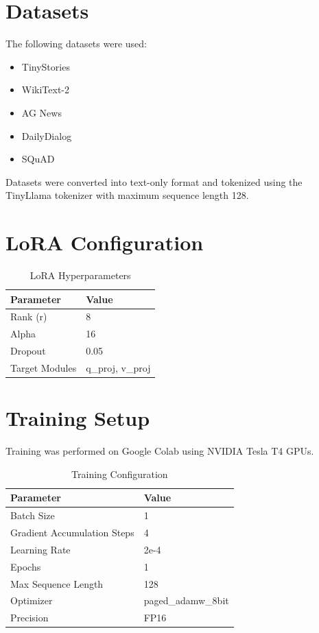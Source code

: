 \documentclass[12pt]{article}
\begin{document}

\section{Datasets}

The following datasets were used:

\begin{itemize}
    \item TinyStories
    \item WikiText-2
    \item AG News
    \item DailyDialog
    \item SQuAD
\end{itemize}

Datasets were converted into text-only format and tokenized using the TinyLlama tokenizer with maximum sequence length 128.


\section{LoRA Configuration}

\begin{table}[H]
\centering
\begin{tabular}{ll}
\toprule
Parameter & Value \\
\midrule
Rank (r) & 8 \\
Alpha & 16 \\
Dropout & 0.05 \\
Target Modules & q\_proj, v\_proj \\
\bottomrule
\end{tabular}
\caption{LoRA Hyperparameters}
\end{table}


\section{Training Setup}

Training was performed on Google Colab using NVIDIA Tesla T4 GPUs.

\begin{table}[H]
\centering
\begin{tabular}{ll}
\toprule
Parameter & Value \\
\midrule
Batch Size & 1 \\
Gradient Accumulation Steps & 4 \\
Learning Rate & 2e-4 \\
Epochs & 1 \\
Max Sequence Length & 128 \\
Optimizer & paged\_adamw\_8bit \\
Precision & FP16 \\
\bottomrule
\end{tabular}
\caption{Training Configuration}
\end{table}
\end{document}
